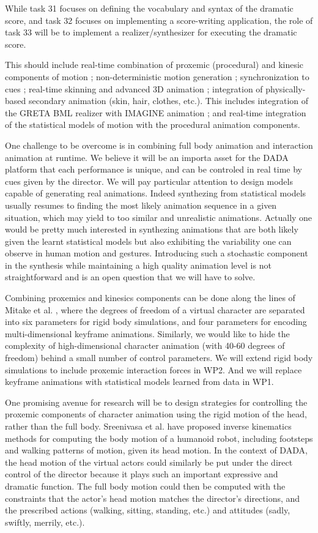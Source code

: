 While task 31 focuses on defining the vocabulary and syntax of the dramatic score, and task 32 focuses on implementing 
a score-writing application, the role of task 33 will be to implement a realizer/synthesizer for executing the dramatic score.

This should include real-time combination of proxemic (procedural) and kinesic components of motion ; non-deterministic motion generation ; synchronization to cues ; real-time skinning and advanced 3D animation ; integration of physically-based secondary animation (skin, hair, clothes, etc.).  This includes integration of the GRETA BML realizer with IMAGINE animation ; and real-time integration of the statistical models of motion with the procedural animation components.


One challenge to be overcome is in combining full 	body animation and interaction animation at runtime. We believe it will be an importa asset for the DADA platform that each performance is unique, and can be controled in real time by cues given by the director. 
  We will pay particular attention to design models capable of generating real animations. Indeed synthezing from statistical models usually resumes to finding the most likely animation sequence in a given situation, which may yield to too similar and unrealistic animations.  Actually one would be pretty much interested in synthezing animations that are both likely given the learnt statistical models but also exhibiting the variability one can observe in human motion and gestures. Introducing such a stochastic component in the synthesis while maintaining a high quality animation level is not  straightforward and is an open question that we will have to solve.

Combining proxemics and kinesics components can be done along the lines of Mitake et al. \cite{Mitake09}, where
the degrees of freedom of a virtual character are separated into six parameters for rigid body simulations,  and four parameters
for encoding multi-dimensional keyframe animations. Similarly, we would like to hide the complexity of high-dimensional 
character animation (with 40-60 degrees of freedom) behind a small number of control parameters. We will extend
rigid body simulations  to include proxemic interaction forces in WP2. And we will replace keyframe animations with statistical models learned from data in WP1. 

One promising avenue for research will be to design strategies for controlling the proxemic components of character animation
using the rigid motion of the head, rather than the full body.  Sreenivasa et al. \cite{Sreenivasa09} have proposed inverse kinematics methods for computing  the body motion of a humanoid robot, including footsteps and walking patterns of motion, given its head motion. In the context of DADA, the head motion of the virtual actors could similarly be put under the direct control of the director because it plays such an important expressive and dramatic function. The full body motion could then be computed with the constraints that the actor's head motion matches the director's directions, and the prescribed actions (walking, sitting, standing, etc.) and attitudes (sadly, swiftly, merrily, etc.).


